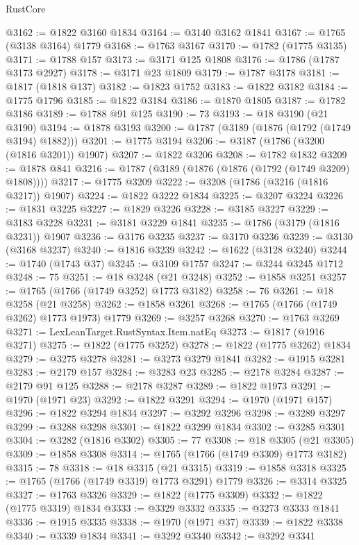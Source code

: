 \begin{lexlean}{RustCore}
\begin{coremodule}
@3162 := @1822 @3160 @1834
@3164 := @3140 @3162 @1841
@3167 := @1765 (@3138 @3164) @1779
@3168 := @1763 @3167
@3170 := @1782 (@1775 @3135)
@3171 := @1788 @157
@3173 := @3171 @125 @1808
@3176 := @1786 (@1787 @3173 @2927)
@3178 := @3171 @23 @1809
@3179 := @1787 @3178
@3181 := @1817 (@1818 @137)
@3182 := @1823 @1752
@3183 := @1822 @3182
@3184 := @1775 @1796
@3185 := @1822 @3184
@3186 := @1870 @1805
@3187 := @1782 @3186
@3189 := @1788 @91 @125
@3190 := 73
@3193 := @18 @3190 (@21 @3190)
@3194 := @1878 @3193
@3200 := @1787 (@3189 (@1876 (@1792 (@1749 @3194) @1882)))
@3201 := @1775 @3194
@3206 := @3187 (@1786 (@3200 (@1816 @3201)) @1907)
@3207 := @1822 @3206
@3208 := @1782 @1832
@3209 := @1878 @841
@3216 := @1787 (@3189 (@1876 (@1876 (@1792 (@1749 @3209) @1808))))
@3217 := @1775 @3209
@3222 := @3208 (@1786 (@3216 (@1816 @3217)) @1907)
@3224 := @1822 @3222 @1834
@3225 := @3207 @3224
@3226 := @1831 @3225
@3227 := @1829 @3226
@3228 := @3185 @3227
@3229 := @3183 @3228
@3231 := @3181 @3229 @1841
@3235 := @1786 (@3179 (@1816 @3231)) @1907
@3236 := @3176 @3235
@3237 := @3170 @3236
@3239 := @3130 (@3168 @3237)
@3240 := @1816 @3239
@3242 := @1622 (@3128 @3240)
@3244 := @1740 (@1743 @37)
@3245 := @3109 @1757
@3247 := @3244 @3245 @1712
@3248 := 75
@3251 := @18 @3248 (@21 @3248)
@3252 := @1858 @3251
@3257 := @1765 (@1766 (@1749 @3252) @1773 @3182)
@3258 := 76
@3261 := @18 @3258 (@21 @3258)
@3262 := @1858 @3261
@3268 := @1765 (@1766 (@1749 @3262) @1773 @1973) @1779
@3269 := @3257 @3268
@3270 := @1763 @3269
@3271 := LexLeanTarget.RustSyntax.Item.natEq
@3273 := @1817 (@1916 @3271)
@3275 := @1822 (@1775 @3252)
@3278 := @1822 (@1775 @3262) @1834
@3279 := @3275 @3278
@3281 := @3273 @3279 @1841
@3282 := @1915 @3281
@3283 := @2179 @157
@3284 := @3283 @23
@3285 := @2178 @3284
@3287 := @2179 @91 @125
@3288 := @2178 @3287
@3289 := @1822 @1973
@3291 := @1970 (@1971 @23)
@3292 := @1822 @3291
@3294 := @1970 (@1971 @157)
@3296 := @1822 @3294 @1834
@3297 := @3292 @3296
@3298 := @3289 @3297
@3299 := @3288 @3298
@3301 := @1822 @3299 @1834
@3302 := @3285 @3301
@3304 := @3282 (@1816 @3302)
@3305 := 77
@3308 := @18 @3305 (@21 @3305)
@3309 := @1858 @3308
@3314 := @1765 (@1766 (@1749 @3309) @1773 @3182)
@3315 := 78
@3318 := @18 @3315 (@21 @3315)
@3319 := @1858 @3318
@3325 := @1765 (@1766 (@1749 @3319) @1773 @3291) @1779
@3326 := @3314 @3325
@3327 := @1763 @3326
@3329 := @1822 (@1775 @3309)
@3332 := @1822 (@1775 @3319) @1834
@3333 := @3329 @3332
@3335 := @3273 @3333 @1841
@3336 := @1915 @3335
@3338 := @1970 (@1971 @37)
@3339 := @1822 @3338
@3340 := @3339 @1834
@3341 := @3292 @3340
@3342 := @3292 @3341

\end{coremodule}
\end{lexlean}
